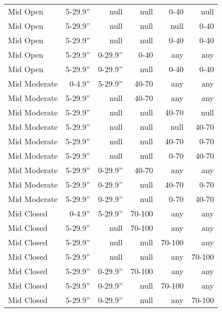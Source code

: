 \begin{table}[!htbp]
\begin{tabular}{@{}lrrrrr@{}}
Mid Open         & 5-29.9''        & null    & null   & 0-40   & null   \\
Mid Open         & 5-29.9''        & null    & null   & null   & 0-40   \\
Mid Open         & 5-29.9''        & null    & null   & 0-40   & 0-40   \\
Mid Open         & 5-29.9''        & 0-29.9'' & 0-40   & any    & any    \\
Mid Open         & 5-29.9''        & 0-29.9'' & null   & 0-40   & 0-40   \\
Mid Moderate     & 0-4.9''         & 5-29.9'' & 40-70  & any    & any    \\
Mid Moderate     & 5-29.9''        & null    & 40-70  & any    & any    \\
Mid Moderate     & 5-29.9''        & null    & null   & 40-70  & null   \\
Mid Moderate     & 5-29.9''        & null    & null   & null   & 40-70  \\
Mid Moderate     & 5-29.9''        & null    & null   & 40-70  & 0-70   \\
Mid Moderate     & 5-29.9''        & null    & null   & 0-70   & 40-70  \\
Mid Moderate     & 5-29.9''        & 0-29.9'' & 40-70  & any    & any    \\
Mid Moderate     & 5-29.9''        & 0-29.9'' & null   & 40-70  & 0-70   \\
Mid Moderate     & 5-29.9''        & 0-29.9'' & null   & 0-70   & 40-70  \\
Mid Closed       & 0-4.9''         & 5-29.9'' & 70-100 & any    & any    \\
Mid Closed       & 5-29.9''        & null    & 70-100 & any    & any    \\
Mid Closed       & 5-29.9''        & null    & null   & 70-100 & any    \\
Mid Closed       & 5-29.9''        & null    & null   & any    & 70-100 \\
Mid Closed       & 5-29.9''        & 0-29.9'' & 70-100 & any    & any    \\
Mid Closed       & 5-29.9''        & 0-29.9'' & null   & 70-100 & any    \\
Mid Closed       & 5-29.9''        & 0-29.9'' & null   & any    & 70-100 \\ \bottomrule
\end{tabular}
\end{table}

